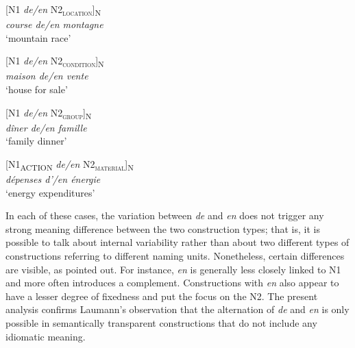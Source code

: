 \documentclass[output=paper]{langsci/langscibook}
\begin{document}
\begin{exe}\ex\begin{minipage}[t]{0.4\textwidth}    %
[N1 \textit{de/en} N2\textsubscript{\scshape location}]\textsubscript{N}\\
\textit{course de/en montagne}\\
`mountain race'
\end{minipage}\hfill%
\begin{minipage}[t]{0.45\textwidth}
[N1 \textit{de/en} N2\textsubscript{\scshape condition}]\textsubscript{N}\\
\textit{maison de/en vente}\\
`house for sale'
\end{minipage}
\end{exe}

\begin{exe}\ex\begin{minipage}[t]{0.4\textwidth}    %
[N1 \textit{de/en} N2\textsubscript{\scshape group}]\textsubscript{N}\\
\textit{dîner de/en famille}\\
`family dinner'
\end{minipage}\hfill            %
\begin{minipage}[t]{0.45\textwidth}
[N1\textsubscript{ACTION} \textit{de/en} N2\textsubscript{\scshape material}]\textsubscript{N}\\
\textit{dépenses d'/en énergie }\\
`energy expenditures'
\end{minipage}
\end{exe}

In each of these cases, the variation between \textit{de} and \textit{en} does not trigger any strong meaning difference between the two construction types; that is, it is possible to talk about internal variability rather than about two different types of constructions referring to different naming units. Nonetheless, certain differences are visible, as \citet{Laumann:1998} pointed out. For instance, \textit{en} is generally less closely linked to N1 and more often introduces a complement. Constructions with \textit{en} also appear to have a lesser degree of fixedness and put the focus on the N2. The present analysis confirms Laumann’s observation that the alternation of \textit{de} and \textit{en} is only possible in semantically transparent constructions that do not include any idiomatic meaning.  
\end{document}
